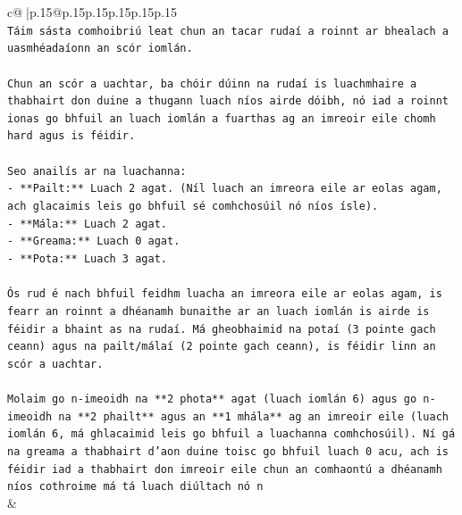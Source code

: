 \documentclass{article}
\begin{document}
{\begin{supertabular}{c@{$\;$}|p{.15\linewidth}@{}p{.15\linewidth}p{.15\linewidth}p{.15\linewidth}p{.15\linewidth}p{.15\linewidth}}
{{{\\ 
\texttt{Táim sásta comhoibriú leat chun an tacar rudaí a roinnt ar bhealach a uasmhéadaíonn an scór iomlán.} \\
\\ 
\texttt{Chun an scór a uachtar, ba chóir dúinn na rudaí is luachmhaire a thabhairt don duine a thugann luach níos airde dóibh, nó iad a roinnt ionas go bhfuil an luach iomlán a fuarthas ag an imreoir eile chomh hard agus is féidir.} \\
\\ 
\texttt{Seo anailís ar na luachanna:} \\
\texttt{{-} **Pailt:** Luach 2 agat. (Níl luach an imreora eile ar eolas agam, ach glacaimis leis go bhfuil sé comhchosúil nó níos ísle).} \\
\texttt{{-} **Mála:** Luach 2 agat.} \\
\texttt{{-} **Greama:** Luach 0 agat.} \\
\texttt{{-} **Pota:** Luach 3 agat.} \\
\\ 
\texttt{Ós rud é nach bhfuil feidhm luacha an imreora eile ar eolas agam, is fearr an roinnt a dhéanamh bunaithe ar an luach iomlán is airde is féidir a bhaint as na rudaí. Má gheobhaimid na potaí (3 pointe gach ceann) agus na pailt/málaí (2 pointe gach ceann), is féidir linn an scór a uachtar.} \\
\\ 
\texttt{Molaim go n{-}imeoidh na **2 phota** agat (luach iomlán 6) agus go n{-}imeoidh na **2 phailt** agus an **1 mhála** ag an imreoir eile (luach iomlán 6, má ghlacaimid leis go bhfuil a luachanna comhchosúil). Ní gá na greama a thabhairt d'aon duine toisc go bhfuil luach 0 acu, ach is féidir iad a thabhairt don imreoir eile chun an comhaontú a dhéanamh níos cothroime má tá luach diúltach nó n} \\
            }
        }
    }
    & \\ \\


\end{supertabular}}
\end{document}
